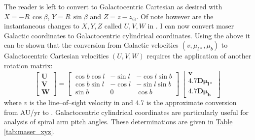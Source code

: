 			The reader is left to convert to Galactocentric Cartesian as desired with $X=-R\,\cos \beta$, $Y=R\,\sin \beta$ and $Z = z-z_\odot$. Of note however are the instantaneous changes to $X,Y,Z$ called $U,V,W$ in \kms. I can now convert maser Galactic coordinates to Galactocentric cylindrical coordinates. Using the above it can be shown that the conversion from Galactic velocities $(v,\mu_{l*},\mu_b)$ to Galactocentric Cartesian velocities $(U,V,W)$ requires the application of another rotation matrix:
    		\[\begin{bmatrix}
    		\boldsymbol{U} \\
    		\boldsymbol{V} \\
    		\boldsymbol{W}
    		\end{bmatrix}
    		=  
    		\begin{bmatrix}
    		\cos b\cos l & -\sin l       & -\cos l\sin b  \\
     		\cos b\sin l & -\cos l       & -\sin l\sin b  \\
     		\sin b       & 0             & \cos b        
    		\end{bmatrix}
    		\
    		\begin{bmatrix}
    		\boldsymbol{v} \\
    		4.7\boldsymbol{D\mu_{l*}} \\
    		4.7\boldsymbol{D\mu_b}
    		\end{bmatrix}
    		\ 	    
    		\] where $v$ is the line--of--sight velocity in \kms and 4.7 is the approximate conversion from AU/yr to \kms. Galactocentric cylindrical coordinates are particularly useful for analysis of spiral arm pitch angles. These determinations are given in \hyperref[tab:maser_xyz]{Table \ref*{tab:maser_xyz}}.
	        
